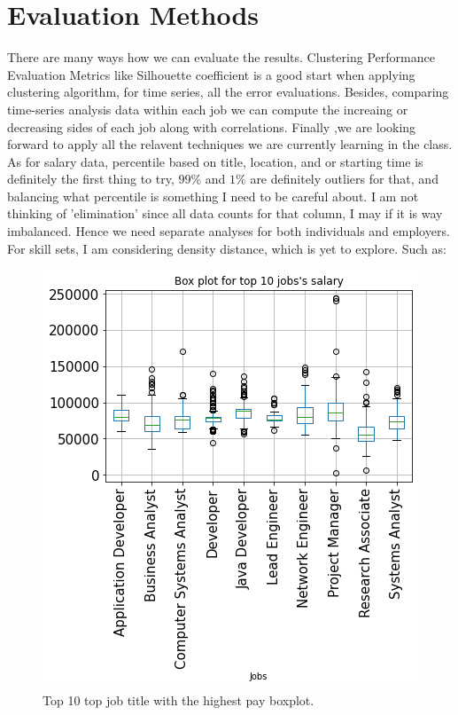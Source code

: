 \section{ Evaluation Methods }
There are many ways how we can evaluate the results. Clustering Performance Evaluation Metrics like Silhouette coefficient is  a good start when applying clustering algorithm, for time series, all the error evaluations.  Besides, comparing time-series analysis data within each job we can compute the increaing or decreasing sides of each job along with correlations. Finally ,we are looking forward to apply all the relavent techniques we are currently learning in the class.\\
As for salary data, percentile based on title, location, and or starting time is definitely the first thing to try, $99\%$ and $1\%$ are definitely outliers for that, and balancing what percentile is something I need to be careful about. I am not thinking of 'elimination' since all data counts for that column, I may if it is way imbalanced. Hence we need separate analyses for both individuals and employers. For skill sets, I am considering density distance, which is yet to explore. Such as: 
\begin{figure}[h!]
	\begin{center}
		\includegraphics[width=.8\linewidth]{./photos/top10jobs.png}
	\end{center}
	\caption{Top 10 top job title with the highest pay boxplot.}
\end{figure}

